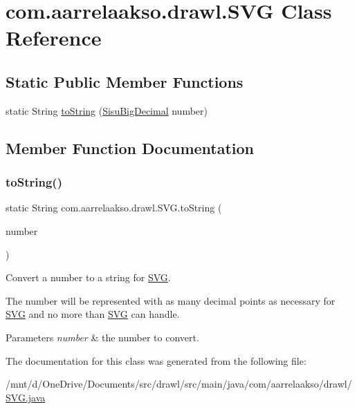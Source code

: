 \hypertarget{classcom_1_1aarrelaakso_1_1drawl_1_1_s_v_g}{}\section{com.\+aarrelaakso.\+drawl.\+S\+VG Class Reference}
\label{classcom_1_1aarrelaakso_1_1drawl_1_1_s_v_g}
\subsection*{Static Public Member Functions}
\begin{DoxyCompactItemize}
\item 
static String \hyperlink{classcom_1_1aarrelaakso_1_1drawl_1_1_s_v_g_a6658c22ded498ee41fdcf637a3cc9dab}{to\+String} (\hyperlink{classcom_1_1aarrelaakso_1_1drawl_1_1_sisu_big_decimal}{Sisu\+Big\+Decimal} number)
\end{DoxyCompactItemize}


\subsection{Member Function Documentation}
\mbox{\label{classcom_1_1aarrelaakso_1_1drawl_1_1_s_v_g_a6658c22ded498ee41fdcf637a3cc9dab}} 
\subsubsection{\texorpdfstring{to\+String()}{toString()}}
{\footnotesize\ttfamily static String com.\+aarrelaakso.\+drawl.\+S\+V\+G.\+to\+String (\begin{DoxyParamCaption}\item[{\hyperlink{classcom_1_1aarrelaakso_1_1drawl_1_1_sisu_big_decimal}{Sisu\+Big\+Decimal}}]{number }\end{DoxyParamCaption})\hspace{0.3cm}{\ttfamily [static]}}

Convert a number to a string for \hyperlink{classcom_1_1aarrelaakso_1_1drawl_1_1_s_v_g}{S\+VG}. 

The number will be represented with as many decimal points as necessary for \hyperlink{classcom_1_1aarrelaakso_1_1drawl_1_1_s_v_g}{S\+VG} and no more than \hyperlink{classcom_1_1aarrelaakso_1_1drawl_1_1_s_v_g}{S\+VG} can handle.


\begin{DoxyParams}{Parameters}
{\em number} & the number to convert. \\
\hline
\end{DoxyParams}


The documentation for this class was generated from the following file\+:\begin{DoxyCompactItemize}
\item 
/mnt/d/\+One\+Drive/\+Documents/src/drawl/src/main/java/com/aarrelaakso/drawl/\hyperlink{_s_v_g_8java}{S\+V\+G.\+java}\end{DoxyCompactItemize}
